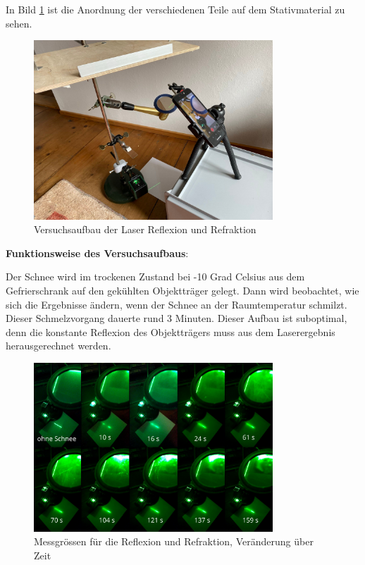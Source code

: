In Bild \ref{fig:LaserAufbau} ist die Anordnung der verschiedenen Teile auf dem Stativmaterial zu sehen.


\begin{figure}
    \centering
    \includegraphics[width=0.8\textwidth]{Bilder/signal-2024-03-10-112013_006.jpeg}
    \caption{Versuchsaufbau der Laser Reflexion und Refraktion}
    \label{fig:LaserAufbau}
\end{figure}


\textbf{Funktionsweise des Versuchsaufbaus}:

Der Schnee wird im trockenen Zustand bei -10 Grad Celsius aus dem Gefrierschrank auf den gekühlten Objektträger gelegt. Dann wird beobachtet, wie sich die Ergebnisse ändern, wenn der Schnee an der Raumtemperatur schmilzt. Dieser Schmelzvorgang dauerte rund 3 Minuten. Dieser Aufbau ist suboptimal, denn die konstante Reflexion des Objektträgers muss aus dem Laserergebnis herausgerechnet werden.


\begin{figure}[H]
    \centering
    \includegraphics[width=0.8\textwidth]{Bilder/Screenshotfrom2024-04-0413-27-28.png}
    \caption{Messgrössen für die Reflexion und Refraktion, Veränderung über Zeit}
    \label{fig:LaserRef}
\end{figure}



